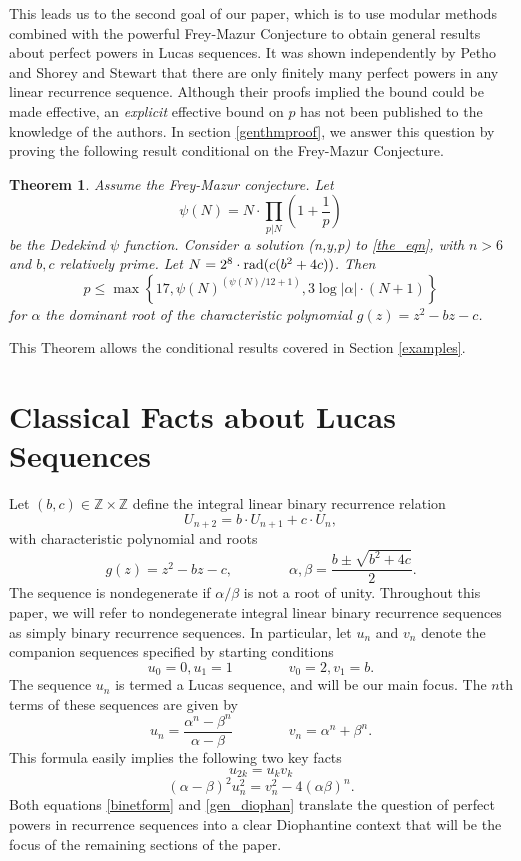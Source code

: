 \documentclass[12pt]{amsart}
\newtheorem{ithm}{Theorem}
\theoremstyle{definition}
\def\Z{{\mathbb Z}}
\newcommand{\rad}{{\rm{rad}}}
\begin{document}
This leads us to the second goal of our paper, which is to use modular methods combined with the powerful Frey-Mazur Conjecture to obtain general results about perfect powers in Lucas sequences. It was shown independently by Petho \cite{petho82} and Shorey and Stewart \cite{shorey83} that there are only finitely many perfect powers in any linear recurrence sequence.  Although their proofs implied the bound could be made effective, an \emph{explicit} effective bound on $p$ has not been published to the knowledge of the authors.  In section \ref{genthmproof}, we answer this question by proving the following result conditional on the Frey-Mazur Conjecture.


\begin{ithm}\label{condbound}
Assume the Frey-Mazur conjecture.  Let 
\[ \psi(N) = N \cdot \prod_{p|N} \left( 1 + \frac{1}{p} \right)\]
be the Dedekind $\psi$ function.  Consider a solution (n,y,p) to \eqref{the_eqn}, with $n > 6$ and $b,c$ relatively prime. Let $N = 2^8 \cdot \rad(c(b^2+4c))$. Then 
\[ p \leq \max\left\{17,   \psi(N)^{(\psi(N)/12+1)}, 3\log{|\alpha|} \cdot ( N+1)  \right\} \]
for $\alpha$ the dominant root of the characteristic polynomial $g(z) = z^2 -bz-c$.
\end{ithm}
This Theorem allows the conditional results covered in Section \ref{examples}.

\section{Classical Facts about Lucas Sequences}\label{classicalresults}


Let $(b,c) \in \Z \times \Z$ define the integral linear binary recurrence relation
\[ U_{n+2} = b\cdot U_{n+1}+ c\cdot U_n, \]
with characteristic polynomial and roots
\[ g(z) = z^2 - bz - c, \qquad \qquad \alpha, \beta = \frac{b \pm \sqrt{b^2+4c}}{2}.\]
The sequence is nondegenerate if $\alpha/\beta$ is not a root of unity.  Throughout this paper, we will refer to nondegenerate integral linear binary recurrence sequences as simply binary recurrence sequences.  In particular, let $u_n$ and $v_n$ denote the companion sequences specified by starting conditions
\[ u_0 = 0, u_1 = 1 \qquad \qquad v_0 = 2, v_1 = b .\]
The sequence $u_n$ is termed a Lucas sequence, and will be our main focus.  The $n$th terms of these sequences are given by 
\begin{equation}\label{binetform} u_n = \frac{\alpha^n - \beta^n}{\alpha - \beta} \qquad \qquad v_n = \alpha^n +\beta^n. \end{equation}
This formula easily implies the following two key facts
\begin{equation}\label{fib2} u_{2k} = u_kv_k \end{equation}
\begin{equation}\label{gen_diophan}(\alpha - \beta)^2u_n^2 = v_n^2 - 4(\alpha\beta)^n. \end{equation}
Both equations \ref{binetform} and \ref{gen_diophan} translate the question of perfect powers in recurrence sequences into a clear Diophantine context that will be the focus of the remaining sections of the paper.
\end{document}

